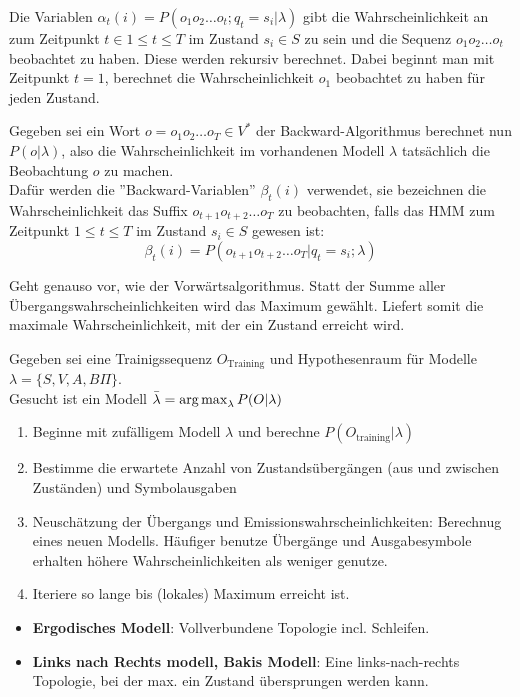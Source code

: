 
Die Variablen $\alpha_t(i) = P(o_1 o_2 \dots o_t; q_t = s_i | \lambda)$ gibt
die Wahrscheinlichkeit an zum Zeitpunkt $t \in 1 \leq t \leq T$ im Zustand $s_i
\in S$ zu sein und die Sequenz $o_1 o_2 \dots o_t$ beobachtet zu haben. Diese
werden rekursiv berechnet. Dabei beginnt man mit Zeitpunkt $t=1$, berechnet
die Wahrscheinlichkeit $o_1$ beobachtet zu haben für jeden Zustand.

Gegeben sei ein Wort $o = o_1 o_2 \dots o_T \in V^*$ der Backward-Algorithmus
berechnet nun $P(o|\lambda)$, also die Wahrscheinlichkeit im vorhandenen Modell
$\lambda$ tatsächlich die Beobachtung $o$ zu machen. \\

Dafür werden die ''Backward-Variablen'' $\beta_t(i)$ verwendet, sie bezeichnen
die Wahrscheinlichkeit das Suffix $o_{t+1} o_{t+2} \ldots o_T$ zu beobachten,
falls das HMM zum Zeitpunkt $1 \le t \le T$ im Zustand $s_i \in S$ gewesen ist:
\begin{displaymath}
    \beta_t(i) = P(o_{t+1} o_{t+2} \dotsc o_T | q_t = s_i; \lambda)
\end{displaymath}

Geht genauso vor, wie der Vorwärtsalgorithmus. Statt der Summe aller
Übergangswahrscheinlichkeiten wird das Maximum gewählt. Liefert somit
die maximale Wahrscheinlichkeit, mit der ein Zustand erreicht wird.



Gegeben sei eine Trainigssequenz $O_{\text{Training}}$ und Hypothesenraum
für Modelle $\lambda = \{S,V,A,B\Pi\}$. \\
Gesucht ist ein Modell $\bar{\lambda} = \operatorname*{arg\,max}_{\lambda} P(O|\lambda)$

\begin{enumerate}
    \item Beginne mit zufälligem Modell $\lambda$ und berechne
    $P(O_{\text{training}}|\lambda)$
    \item Bestimme die erwartete Anzahl von Zustandsübergängen (aus und
    zwischen Zuständen) und Symbolausgaben
    \item Neuschätzung der Übergangs und Emissionswahrscheinlichkeiten:
    Berechnug eines neuen Modells. Häufiger benutze Übergänge und
    Ausgabesymbole erhalten höhere Wahrscheinlichkeiten als weniger genutze.
    \item Iteriere so lange bis (lokales) Maximum erreicht ist.
\end{enumerate}

\begin{itemize}
    \item \textbf{Ergodisches Modell}: Vollverbundene Topologie incl. Schleifen.
    \item \textbf{Links nach Rechts modell, Bakis Modell}: Eine links-nach-rechts
    Topologie, bei der max. ein Zustand übersprungen werden kann.
\end{itemize}
